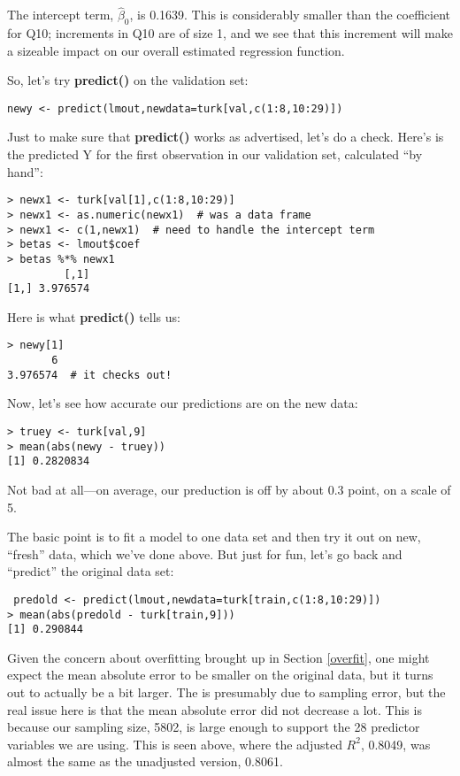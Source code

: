 The intercept term, $\widehat{\beta}_0$, is 0.1639.  This is
considerably smaller than the coefficient for Q10; increments in Q10 are
of size 1, and we see that this increment will make a sizeable impact on
our overall estimated regression function.

So, let's try {\bf predict()} on the validation set:

\begin{lstlisting}
newy <- predict(lmout,newdata=turk[val,c(1:8,10:29)])
\end{lstlisting}

Just to make sure that {\bf predict()} works as advertised, let's do a
check.  Here's is the predicted Y for the first observation in our
validation set, calculated ``by hand'':

\begin{lstlisting}
> newx1 <- turk[val[1],c(1:8,10:29)]
> newx1 <- as.numeric(newx1)  # was a data frame
> newx1 <- c(1,newx1)  # need to handle the intercept term
> betas <- lmout$coef
> betas %*% newx1
         [,1]
[1,] 3.976574
\end{lstlisting}

Here is what {\bf predict()} tells us:

\begin{lstlisting}
> newy[1]
       6 
3.976574  # it checks out!
\end{lstlisting}

Now, let's see how accurate our predictions are on the new data:

\begin{lstlisting}
> truey <- turk[val,9]
> mean(abs(newy - truey))
[1] 0.2820834
\end{lstlisting}

Not bad at all---on average, our preduction is off by about 0.3 point,
on a scale of 5.

The basic point is to fit a model to one data set and then try it out on
new, ``fresh'' data, which we've done above.  But just for fun, let's go
back and ``predict'' the original data set:

\begin{lstlisting}
 predold <- predict(lmout,newdata=turk[train,c(1:8,10:29)])
> mean(abs(predold - turk[train,9]))
[1] 0.290844
\end{lstlisting}

Given the concern about overfitting brought up in Section \ref{overfit},
one might expect the mean absolute error to be smaller on the original
data, but it turns out to actually be a bit larger.  The is presumably
due to sampling error, but the real issue here is that the mean absolute
error did not decrease a lot.  This is because our sampling size, 5802,
is large enough to support the 28 predictor variables we are using.
This is seen above, where the adjusted $R^2$, 0.8049, was almost the
same as the unadjusted version, 0.8061.

